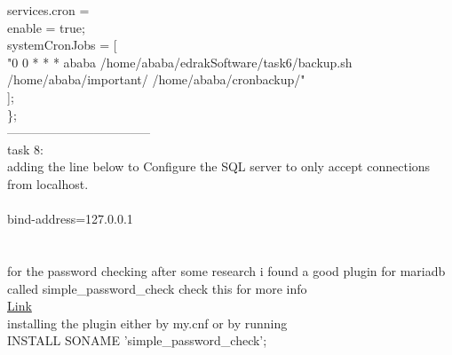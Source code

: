 \documentclass[a4paper,14pt]{extarticle}
\begin{document}
services.cron = {\\
    enable = true;\\
    systemCronJobs = [\\
      "0 0 * * *  ababa    /home/ababa/edrakSoftware/task6/backup.sh /home/ababa/important/ /home/ababa/cronbackup/"\\
   ];\\
\};\\
-----------------------------------\\
\newpage
task 8:\\
adding the line below to Configure the SQL server to only accept connections from localhost.\\
\\
bind-address=127.0.0.1\\
\\
\\
for the password checking after some research i found a good plugin for mariadb called simple\_password\_check check this for more info\\
\href{https://mariadb.com/kb/en/simple-password-check-plugin/}{Link}\\
installing the plugin either by my.cnf or by running\\
INSTALL SONAME 'simple\_password\_check';\\

}
\end{document}
